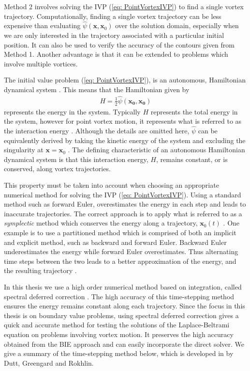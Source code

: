 \documentclass{sfuthesis}
\begin{document}
Method 2 involves solving the IVP (\ref{eq: PointVortexIVP}) to find a single vortex trajectory. Computationally, finding a single vortex trajectory can be less expensive than evaluating $\hat{\psi}(\mathbf{x}, \mathbf{x}_0)$ over the solution domain, especially when we are only interested in the trajectory associated with a particular initial position. It can also be used to verify the accuracy of the contours given from Method 1. Another advantage is that it can be extended to problems which involve multiple vortices.

The initial value problem (\ref{eq: PointVortexIVP}), is an autonomous, Hamiltonian dynamical system \cite{Crowdy2006, Saff92, Newt2001, Drit15}. This means that the Hamiltonian given by 
\begin{align*}
	H=\frac{1}{2}\hat{\psi}(\mathbf{x_0},\mathbf{x_0})
\end{align*} 
represents the energy in the system. Typically $H$ represents the total energy in the system, however for point vortex motion, it represents what is referred to as the interaction energy \cite{Newt2001, Drit15}. Although the details are omitted here, $\hat{\psi}$ can be equivalently derived by taking the kinetic energy of the system and excluding the singularity at $\mathbf{x}=\mathbf{x}_0$ \cite{Drit15}. The defining characteristic of an autonomous Hamiltonian dynamical system is that this interaction energy, $H$, remains constant, or is conserved, along vortex trajectories. 

This property must be taken into account when choosing an appropriate numerical method for solving the IVP (\ref{eq: PointVortexIVP}). Using a standard method such as forward Euler, overestimates the energy in each step and leads to inaccurate trajectories. The correct approach is to apply what is referred to as a {\textit{symplectic}} method which conserves the energy along a trajectory, $\mathbf{x}_0(t)$ \cite{Hair2006}. One example is to use a partitioned method which is comprised of both an implicit and explicit method, such as backward and forward Euler. Backward Euler underestimates the energy while forward Euler overestimates. Thus alternating time steps between the two leads to a better approximation of the energy, and the resulting trajectory \cite{Hair2006}. 

In this thesis we use a high order numerical method based on integration, called spectral deferred correction \cite{Dutt2000}. The high accuracy of this time-stepping method ensures the energy remains constant along each trajectory. Since the focus in this thesis is on boundary value problems, using spectral deferred correction gives a quick and accurate method for testing the solutions of the Laplace-Beltrami equation on problems involving vortex motion. It preserves the high accuracy obtained from the BIE approach and can easily incorporate the direct solver. We give a summary of the time-stepping method below, which is developed in \cite{Dutt2000} by Dutt, Greengard and Rokhlin.
\end{document}

